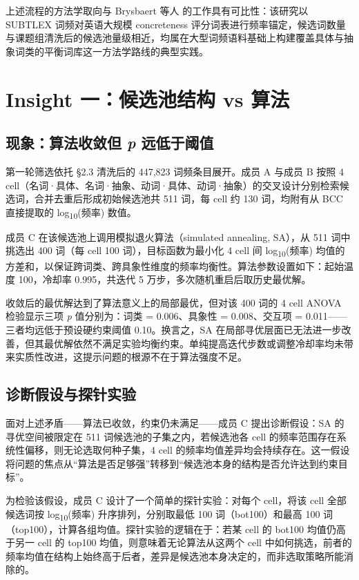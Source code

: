 \documentclass[12pt, a4paper]{article}
\begin{document}
上述流程的方法学取向与 Brysbaert 等人 \cite{brysbaert2014concreteness} 的工作具有可比性：该研究以 SUBTLEX 词频对英语大规模 concreteness 评分词表进行频率锚定，候选词数量与课题组清洗后的候选池量级相近，均属在大型词频语料基础上构建覆盖具体与抽象词类的平衡词库这一方法学路线的典型实践。

\section{Insight 一：候选池结构 vs 算法}
\label{sec:finding1}

\subsection{现象：算法收敛但 \textit{p} 远低于阈值}

第一轮筛选依托 §2.3 清洗后的 447,823 词频条目展开。成员 A 与成员 B 按照 4 cell（名词·具体、名词·抽象、动词·具体、动词·抽象）的交叉设计分别检索候选词，合并去重后形成初始候选池共 511 词，每 cell 约 130 词，均附有从 BCC 直接提取的 log\textsubscript{10}(频率) 数值。

成员 C 在该候选池上调用模拟退火算法（simulated annealing, SA）\cite{kirkpatrick1983sa}，从 511 词中挑选出 400 词（每 cell 100 词），目标函数为最小化 4 cell 间 log\textsubscript{10}(频率) 均值的方差和，以保证跨词类、跨具象性维度的频率均衡性。算法参数设置如下：起始温度 100，冷却率 0.995，共迭代 5 万步，多次随机重启后取历史最优解。

收敛后的最优解达到了算法意义上的局部最优，但对该 400 词的 4 cell ANOVA 检验显示三项 \textit{p} 值分别为：词类 = 0.006、具象性 = 0.008、交互项 = 0.011——三者均远低于预设硬约束阈值 0.10。换言之，SA 在局部寻优层面已无法进一步改善，但其最优解依然不满足实验均衡约束。单纯提高迭代步数或调整冷却率均未带来实质性改进，这提示问题的根源不在于算法强度不足。

\subsection{诊断假设与探针实验}

面对上述矛盾——算法已收敛，约束仍未满足——成员 C 提出诊断假设：SA 的寻优空间被限定在 511 词候选池的子集之内，若候选池各 cell 的频率范围存在系统性偏移，则无论选取何种子集，4 cell 的频率均值差异均会持续存在。这一假设将问题的焦点从“算法是否足够强”转移到“候选池本身的结构是否允许达到约束目标”。

为检验该假设，成员 C 设计了一个简单的探针实验：对每个 cell，将该 cell 全部候选词按 log\textsubscript{10}(频率) 升序排列，分别取最低 100 词（bot100）和最高 100 词（top100），计算各组均值。探针实验的逻辑在于：若某 cell 的 bot100 均值仍高于另一 cell 的 top100 均值，则意味着无论算法从这两个 cell 中如何挑选，前者的频率均值在结构上始终高于后者，差异是候选池本身决定的，而非选取策略所能消除的。
\end{document}
